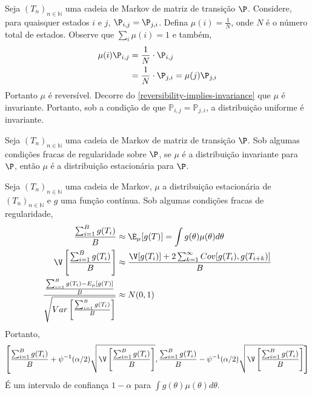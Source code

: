 \begin{example}
 Seja $(T_{n})_{n \in \mathbb{N}}$ uma 
 cadeia de Markov de matriz de transição $\P$. 
 Considere, para quaisquer estados $i$ e $j$, 
 $\P_{i,j} = \P_{j,i}$. 
 Defina $\mu(i) = \frac{1}{N}$, onde
 $N$ é o número total de estados.
 Observe que $\sum_{i}{\mu(i)} = 1$ e também,
 \begin{align*}
  \mu(i) \P_{i,j}
  &= \frac{1}{N} \cdot \P_{i,j} \\
  &= \frac{1}{N} \cdot \P_{j,i}
  = \mu(j) \P_{j,i}
 \end{align*}
 Portanto $\mu$ é reversível.
 Decorre do \cref{reversibility-implies-invariance}
 que $\mu$ é invariante. 
 Portanto, sob a condição de que $\mathbb{P}_{i,j} = \mathbb{P}_{j,i}$,
 a distribuição uniforme é invariante. 
\end{example}

\begin{theorem}
 Seja $(T_{n})_{n \in \mathbb{N}}$ uma
 cadeia de Markov de matriz de transição $\P$. 
 Sob algumas condições fracas de regularidade
 sobre $\P$, se $\mu$ é a
 distribuição invariante para $\P$, então
 $\mu$ é a distribuição estacionária para
 $\P$.
\end{theorem}

\begin{theorem}
 \label{theorem:clt-markov}
 Seja $(T_{n})_{n \in \mathbb{N}}$ uma 
 cadeia de Markov,
 $\mu$ a distribuição estacionária de
 $(T_{n})_{n \in \mathbb{N}}$ e 
 $g$ uma função contínua.
 Sob algumas condições fracas de regularidade,
 \begin{align*}
  \frac{\sum_{i=1}^{B}{g(T_{i})}}{B}
  &\approx \E_{\mu}[g(T)]
  = \int{g(\theta)\mu(\theta)d\theta} \\
  \V\left[\frac{\sum_{i=1}^{B}{g(T_{i})}}{B}\right] 
  &\approx \frac{\V[g(T_{i})]+2\sum_{k=1}^{\infty}{Cov[g(T_{i}),g(T_{i+k})]}}{B} \\
  \frac{\frac{\sum_{i=1}^{B}{g(T_{i})-E_{\mu}[g(T)]}}{B}}{\sqrt{Var\left[\frac{\sum_{i=1}^{B}{g(T_{i})}}{B}\right]}} &\approx N(0,1)
 \end{align*}
 Portanto,
 \begin{align*}
  \left[\frac{\sum_{i=1}^{B}{g(T_{i})}}{B}+\psi^{-1}(\alpha/2)\sqrt{\V\left[\frac{\sum_{i=1}^{B}{g(T_{i})}}{B}\right]},\frac{\sum_{i=1}^{B}{g(T_{i})}}{B}-\psi^{-1}(\alpha/2)\sqrt{\V\left[\frac{\sum_{i=1}^{B}{g(T_{i})}}{B}\right]}\right]
 \end{align*}
 É um intervalo de confiança $1-\alpha$ para
 $\int{g(\theta)\mu(\theta)d\theta}$.
\end{theorem}


